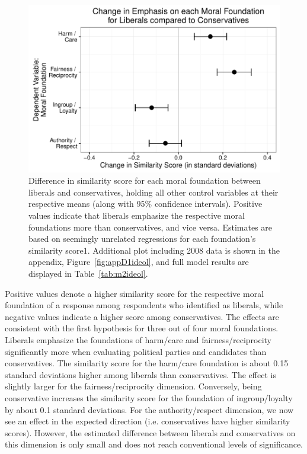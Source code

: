 \documentclass[12pt]{article}
\begin{document}
\begin{figure}[h]\centering
\includegraphics[scale=.9]{../calc/fig/fig2ideol.pdf}
\caption{Difference in similarity score for each moral foundation between liberals and conservatives, holding all other control variables at their respective means (along with 95\% confidence intervals). Positive values indicate that liberals emphasize the respective moral foundations more than conservatives, and vice versa. Estimates are based on seemingly unrelated regressions for each foundation's similarity score1. Additional plot including 2008 data is shown in the appendix, Figure~\ref{fig:appD1ideol}, and full model results are displayed in Table~\ref{tab:m2ideol}.}\label{fig:2ideol}
\end{figure}

Positive values denote a higher similarity score for the respective moral foundation of a response among respondents who identified as liberals, while negative values indicate a higher score among conservatives. The effects are consistent with the first hypothesis for three out of four moral foundations. Liberals emphasize the foundations of harm/care and fairness/reciprocity significantly more when evaluating political parties and candidates than conservatives. The similarity score for the harm/care foundation is about 0.15 standard deviations higher among liberals than conservatives. The effect is slightly larger for the fairness/reciprocity dimension. Conversely, being conservative increases the similarity score for the foundation of ingroup/loyalty by about 0.1 standard deviations. For the authority/respect dimension, we now see an effect in the expected direction (i.e. conservatives have higher similarity scores). However, the estimated difference between liberals and conservatives on this dimension is only small and does not reach conventional levels of significance.
\end{document}
